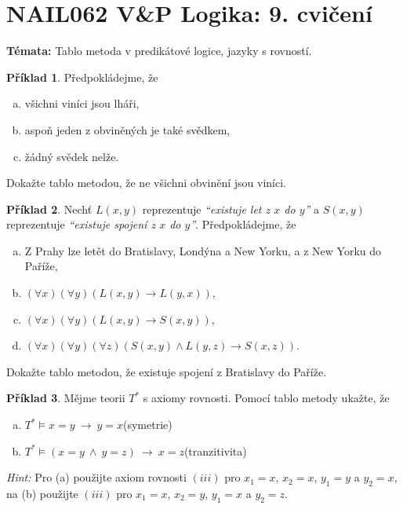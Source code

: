 \documentclass[a4paper]{article}
\theoremstyle{plain}
\theoremstyle{definition}
\newtheorem{problem}{Příklad}
\begin{document}
\section*{NAIL062 V\&P Logika: 9. cvičení}


\textbf{Témata:}
Tablo metoda v predikátové logice, jazyky s rovností.


\medskip\begin{problem}
    Předpokládejme, že
    \begin{enumerate}[(a)]
    \item všichni viníci jsou lháři,
    \item aspoň jeden z obviněných je také svědkem,
    \item žádný svědek nelže.
    \end{enumerate}
    Dokažte tablo metodou, že ne všichni obvinění jsou viníci.
\end{problem} 
    
    
    
\medskip\begin{problem} Nechť $L(x,y)$ reprezentuje \emph{``existuje let z $x$ do $y$''} a $S(x,y)$ reprezentuje \emph{``existuje spojení z $x$ do $y$''}. Předpokládejme, že
    \begin{enumerate}[(a)]
    \itemsep6pt
    \item Z Prahy lze letět do Bratislavy, Londýna a New Yorku, a z New Yorku do Paříže,
    \item $(\forall x)(\forall y)(L(x,y) \to L(y,x))$,
    \item $(\forall x)(\forall y)(L(x,y)\to S(x,y))$,
    \item $(\forall x)(\forall y)(\forall z)(S(x,y)\wedge L(y,z)\to S(x,z))$.
    \end{enumerate}
    Dokažte tablo metodou, že existuje spojení z Bratislavy do Paříže.
\end{problem} 


\medskip\begin{problem} Mějme teorii $T^*$ s axiomy rovnosti. Pomocí tablo metody ukažte, že 
\begin{enumerate}[(a)]
    \itemsep6pt
    \item $T^*\models x=y\ \to\ y=x$\hfill(symetrie)
    \item $T^*\models (x=y\ \wedge\ y=z)\ \to\ x=z$\hfill(tranzitivita)
\end{enumerate}
{\it Hint:} Pro (a) použijte axiom rovnosti $(iii)$ pro $x_1=x$, $x_2=x$, $y_1=y$ a $y_2=x$, \newline
    na (b) použijte $(iii)$ pro $x_1=x$, $x_2=y$, $y_1=x$ a $y_2=z$.
\end{problem}
\end{document}
